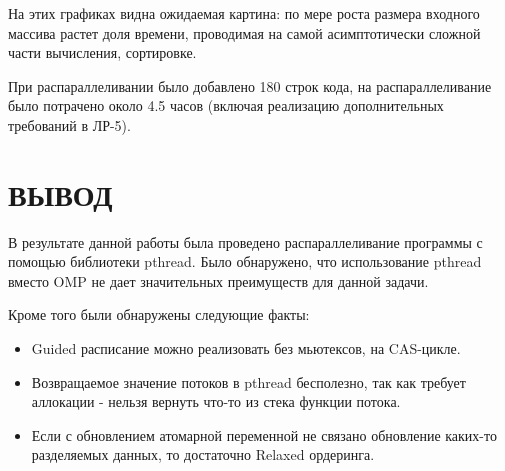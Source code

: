 \documentclass[14pt, a4paper, oneside, final]{extarticle}
\begin{document}
На этих графиках видна ожидаемая картина: по мере роста размера входного массива растет доля времени, проводимая на самой асимптотически сложной части вычисления, сортировке.

При распараллеливании было добавлено 180 строк кода, на распараллеливание было потрачено около 4.5 часов (включая реализацию дополнительных требований в ЛР-5).

\clearpage
\section*{ВЫВОД}

В результате данной работы была проведено распараллеливание программы с помощью библиотеки pthread. Было обнаружено, что использование pthread вместо OMP не дает значительных преимуществ для данной задачи.

Кроме того были обнаружены следующие факты:

\begin{itemize}
 \item Guided расписание можно реализовать без мьютексов, на CAS-цикле.
 \item Возвращаемое значение потоков в pthread бесполезно, так как требует аллокации - нельзя вернуть что-то из стека функции потока.
 \item Если с обновлением атомарной переменной не связано обновление каких-то разделяемых данных, то достаточно Relaxed ордеринга.
\end{itemize}
\end{document}
